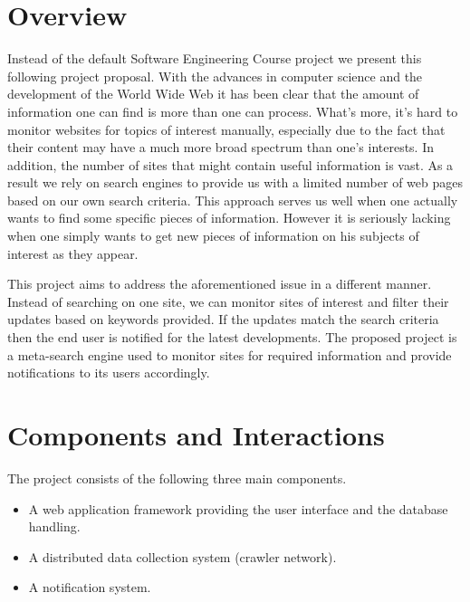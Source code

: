 \documentclass[a4paper,10pt]{article} \usepackage{anysize}
\begin{document}



\section{Overview}
    Instead of the default Software Engineering Course project we present
    this following project proposal. With the advances in computer science and
    the development of the World Wide Web it has been clear that the amount
    of information one can find is more than one can process. What's more, it's
    hard to monitor websites for topics of interest manually, especially due to
    the fact that their content may have a much more broad spectrum than one's
    interests. In addition, the number of sites that might contain useful
    information is vast. As a result we rely on search engines to provide us
    with a limited number of web pages based on our own search criteria. This
    approach serves us well when one actually wants to find some specific
    pieces of information. However it is seriously lacking when one simply
    wants to get new pieces of information on his subjects of interest as they
    appear. 

    This project aims to address the aforementioned issue in a different
    manner. Instead of searching on one site, we can monitor sites of
    interest and filter their updates based on keywords provided. If the
    updates match the search criteria then the end user is notified for the
    latest developments. The proposed project is a meta-search engine used to
    monitor sites for required information and provide notifications to its
    users accordingly. 

\section{Components and Interactions}
    The project consists of the following three main components.
    \begin{itemize}
        \item A web application framework providing the user interface and the
            database handling.
        \item A distributed data collection system (crawler network).
        \item A notification system.
    \end{itemize}
\end{document}
